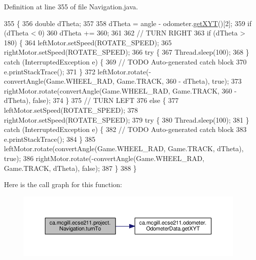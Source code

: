 Definition at line 355 of file Navigation.\+java.


\begin{DoxyCode}
355                                                 \{
356     \textcolor{keywordtype}{double} dTheta;
357 
358     dTheta = angle - odometer.\hyperlink{classca_1_1mcgill_1_1ecse211_1_1odometer_1_1_odometer_data_a8f40f0264c68f0cbed4fff1723ae7863}{getXYT}()[2];
359     \textcolor{keywordflow}{if} (dTheta < 0)
360       dTheta += 360;
361 
362     \textcolor{comment}{// TURN RIGHT}
363     \textcolor{keywordflow}{if} (dTheta > 180) \{
364       leftMotor.setSpeed(ROTATE\_SPEED);
365       rightMotor.setSpeed(ROTATE\_SPEED);
366       \textcolor{keywordflow}{try} \{
367         Thread.sleep(100);
368       \} \textcolor{keywordflow}{catch} (InterruptedException e) \{
369         \textcolor{comment}{// TODO Auto-generated catch block}
370         e.printStackTrace();
371       \}
372       leftMotor.rotate(-convertAngle(Game.WHEEL\_RAD, Game.TRACK, 360 - dTheta), \textcolor{keyword}{true});
373       rightMotor.rotate(convertAngle(Game.WHEEL\_RAD, Game.TRACK, 360 - dTheta), \textcolor{keyword}{false});
374     \}
375     \textcolor{comment}{// TURN LEFT}
376     \textcolor{keywordflow}{else} \{
377       leftMotor.setSpeed(ROTATE\_SPEED);
378       rightMotor.setSpeed(ROTATE\_SPEED);
379       \textcolor{keywordflow}{try} \{
380         Thread.sleep(100);
381       \} \textcolor{keywordflow}{catch} (InterruptedException e) \{
382         \textcolor{comment}{// TODO Auto-generated catch block}
383         e.printStackTrace();
384       \}
385       leftMotor.rotate(convertAngle(Game.WHEEL\_RAD, Game.TRACK, dTheta), \textcolor{keyword}{true});
386       rightMotor.rotate(-convertAngle(Game.WHEEL\_RAD, Game.TRACK, dTheta), \textcolor{keyword}{false});
387     \}
388   \}
\end{DoxyCode}
Here is the call graph for this function\+:
\nopagebreak
\begin{figure}[H]
\begin{center}
\leavevmode
\includegraphics[width=350pt]{classca_1_1mcgill_1_1ecse211_1_1project_1_1_navigation_a3bbe0645f2b3b3d0986b4a707fb5a00c_cgraph}
\end{center}
\end{figure}
